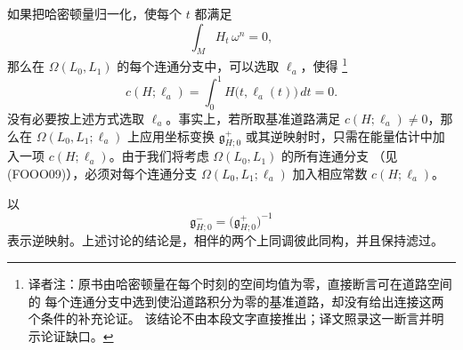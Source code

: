 \begin{remark}
\label{rem:normalized-hamiltonian-base-path}
如果把哈密顿量归一化，使每个 $t$ 都满足
\[
  \int_MH_t\,\omega^n=0,
\]
那么在 $\Omega(L_0,L_1)$ 的每个连通分支中，可以选取 $\ell_a$，使得
\footnote{译者注：原书由哈密顿量在每个时刻的空间均值为零，直接断言可在道路空间的
每个连通分支中选到使沿道路积分为零的基准道路，却没有给出连接这两个条件的补充论证。
该结论不由本段文字直接推出；译文照录这一断言并明示论证缺口。}
\[
  c(H;\ell_a)
  =
  \int_0^1H\bigl(t,\ell_a(t)\bigr)\,dt
  =
  0.
\]
没有必要按上述方式选取 $\ell_a$。事实上，若所取基准道路满足
$c(H;\ell_a)\neq0$，那么在 $\Omega(L_0,L_1;\ell_a)$ 上应用坐标变换
$\mathfrak g_{H;0}^+$ 或其逆映射时，只需在能量估计中加入一项
$c(H;\ell_a)$。由于我们将考虑 $\Omega(L_0,L_1)$ 的所有连通分支
（见 (FOOO09)），必须对每个连通分支 $\Omega(L_0,L_1;\ell_a)$ 加入相应常数
$c(H;\ell_a)$。
\end{remark}

以
\[
  \mathfrak g_{H;0}^-
  =
  \bigl(\mathfrak g_{H;0}^+\bigr)^{-1}
\]
表示逆映射。上述讨论的结论是，相伴的两个\personFloer{}上同调彼此同构，并且保持滤过。

